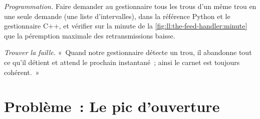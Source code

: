 \begin{exercise}[$\star\star\star$]\label{exo:ll:the-feed-handler:7}
\emph{Programmation.} Faire demander au gestionnaire tous les trous d'un même trou en une seule demande (une liste d'intervalles), dans la référence Python et
le gestionnaire C++, et vérifier sur la minute de la \cref{fig:ll:the-feed-handler:minute} que la péremption maximale des retransmissions baisse.
\end{exercise}

\begin{exercise}[$\star\star\star$]\label{exo:ll:the-feed-handler:8}
\emph{Trouver la faille.} «~Quand notre gestionnaire détecte un trou, il abandonne tout ce qu'il détient et attend le prochain instantané~; ainsi
le carnet est toujours cohérent.~»
\end{exercise}

\section{Problème~: Le pic d'ouverture}

